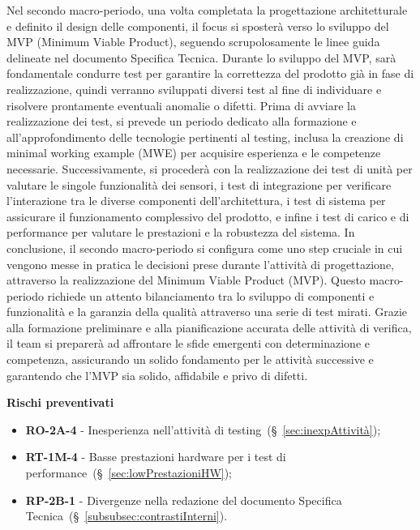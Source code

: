 \vspace{0.2cm}

Nel secondo macro-periodo, una volta completata la progettazione architetturale e definito il design delle componenti, il focus si sposterà verso lo sviluppo del MVP (Minimum Viable Product), seguendo scrupolosamente le linee guida delineate nel documento Specifica Tecnica. Durante lo sviluppo del MVP, sarà fondamentale condurre test per garantire la correttezza del prodotto già in fase di realizzazione, quindi verranno sviluppati diversi test al fine di individuare e risolvere prontamente eventuali anomalie o difetti.
Prima di avviare la realizzazione dei test, si prevede un periodo dedicato alla formazione e all'approfondimento delle tecnologie pertinenti al testing, inclusa la creazione di minimal working example (MWE) per acquisire esperienza e le competenze necessarie.
Successivamente, si procederà con la realizzazione dei test di unità per valutare le singole funzionalità dei sensori, i test di integrazione per verificare l'interazione tra le diverse componenti dell'architettura, i test di sistema per assicurare il funzionamento complessivo del prodotto, e infine i test di carico e di performance per valutare le prestazioni e la robustezza del sistema.
In conclusione, il secondo macro-periodo si configura come uno step cruciale in cui vengono messe in pratica le decisioni prese durante l’attività di progettazione, attraverso la realizzazione del Minimum Viable Product (MVP). Questo macro-periodo richiede un attento bilanciamento tra lo sviluppo di componenti e funzionalità e la garanzia della qualità attraverso una serie di test mirati. Grazie alla formazione preliminare e alla pianificazione accurata delle attività di verifica, il team si preparerà ad affrontare le sfide emergenti con determinazione e competenza, assicurando un solido fondamento per le attività successive e garantendo che l'MVP sia solido, affidabile e privo di difetti.

\vspace{0.4cm}

\textbf{Rischi preventivati}
\begin{itemize}
    \item \textbf{RO-2A-4} - Inesperienza nell’attività di testing~(\S~\ref{sec:inexpAttività});
    \item \textbf{RT-1M-4} - Basse prestazioni hardware per i test di performance~(\S~\ref{sec:lowPrestazioniHW});
    \item \textbf{RP-2B-1} - Divergenze nella redazione del documento Specifica Tecnica~(\S~\ref{subsubsec:contrastiInterni}).
\end{itemize}

